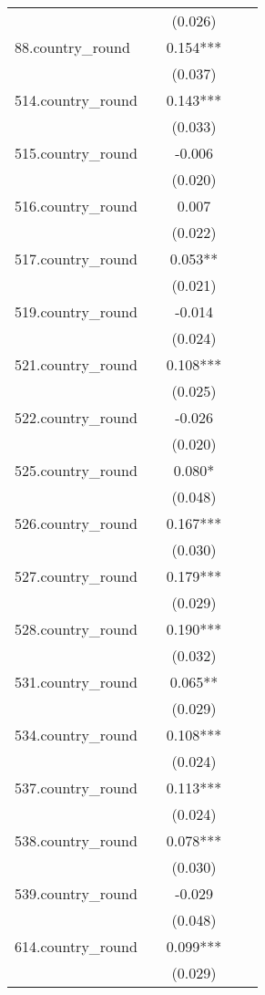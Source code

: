\documentclass[]{article}
\begin{document}
\begin{tabular}{lcccc}
 &  & (0.026) &  &  \\
88.country\_round &  & 0.154*** &  &  \\
 &  & (0.037) &  &  \\
514.country\_round &  & 0.143*** &  &  \\
 &  & (0.033) &  &  \\
515.country\_round &  & -0.006 &  &  \\
 &  & (0.020) &  &  \\
516.country\_round &  & 0.007 &  &  \\
 &  & (0.022) &  &  \\
517.country\_round &  & 0.053** &  &  \\
 &  & (0.021) &  &  \\
519.country\_round &  & -0.014 &  &  \\
 &  & (0.024) &  &  \\
521.country\_round &  & 0.108*** &  &  \\
 &  & (0.025) &  &  \\
522.country\_round &  & -0.026 &  &  \\
 &  & (0.020) &  &  \\
525.country\_round &  & 0.080* &  &  \\
 &  & (0.048) &  &  \\
526.country\_round &  & 0.167*** &  &  \\
 &  & (0.030) &  &  \\
527.country\_round &  & 0.179*** &  &  \\
 &  & (0.029) &  &  \\
528.country\_round &  & 0.190*** &  &  \\
 &  & (0.032) &  &  \\
531.country\_round &  & 0.065** &  &  \\
 &  & (0.029) &  &  \\
534.country\_round &  & 0.108*** &  &  \\
 &  & (0.024) &  &  \\
537.country\_round &  & 0.113*** &  &  \\
 &  & (0.024) &  &  \\
538.country\_round &  & 0.078*** &  &  \\
 &  & (0.030) &  &  \\
539.country\_round &  & -0.029 &  &  \\
 &  & (0.048) &  &  \\
614.country\_round &  & 0.099*** &  &  \\
 &  & (0.029) &  &  \\

\end{tabular}
\end{document}

